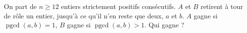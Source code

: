 On part de $n \geq 12$ entiers strictement positifs consécutifs. $A$ et $B$ retirent à tour de rôle un entier, jusqu'à ce qu'il n'en reste que deux, $a$ et $b$. $A$ gagne si $\operatorname{pgcd}(a, b) = 1$, $B$ gagne si $\operatorname{pgcd}(a, b) > 1$. Qui gagne ?
